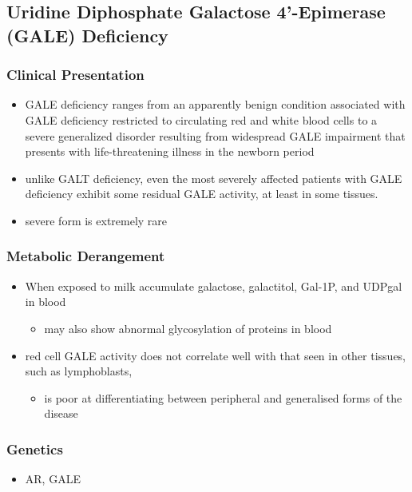 \documentclass{scrartcl}
\begin{document}
\subsection{Uridine Diphosphate Galactose 4’-Epimerase (GALE) Deficiency}
\label{sec:org41f0bab}
\subsubsection{Clinical Presentation}
\label{sec:orgd19f224}
\begin{itemize}
\item GALE deficiency ranges from an apparently benign condition
associated with GALE deficiency restricted to circulating red and
white blood cells to a severe generalized disorder resulting from
widespread GALE impairment that presents with life-threatening
illness in the newborn period
\item unlike GALT deficiency, even the most severely affected patients
with GALE deficiency exhibit some residual GALE activity, at least
in some tissues.
\item severe form is extremely rare
\end{itemize}

\subsubsection{Metabolic Derangement}
\label{sec:orgc4bd167}
\begin{itemize}
\item When exposed to milk accumulate galactose, galactitol, Gal-1P, and
UDPgal in blood
\begin{itemize}
\item may also show abnormal glycosylation of proteins in blood
\end{itemize}
\item red cell GALE activity does not correlate well with that seen in
other tissues, such as lymphoblasts,
\begin{itemize}
\item is poor at differentiating between peripheral and generalised forms of the disease
\end{itemize}
\end{itemize}

\subsubsection{Genetics}
\label{sec:orgfcf5553}
\begin{itemize}
\item AR, GALE
\end{itemize}
\end{document}

